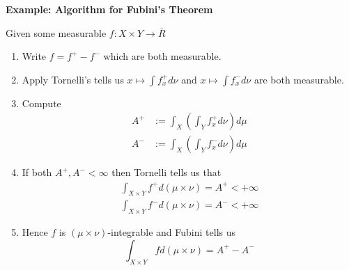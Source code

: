\documentclass[11pt]{article}
\newcommand{\defeq}{:=}
\newenvironment{eg}
{\begin{mdframed}[backgroundcolor=mylg,roundcorner=5pt,linewidth=0pt]\bfseries{Example:}\normalfont}
	{\end{mdframed}}
\begin{document}
\begin{eg}
	\textbf{Algorithm for Fubini's Theorem}

	Given some measurable $f:X\times Y \to \overline{R}$
	\begin{enumerate}
		\item Write $f=f^+ - f^-$ which are both measurable.
		\item Apply Tornelli's tells us $x\mapsto \int f^+_x d\nu $ and $x\mapsto\int f^-_x d\nu$ are both measurable.
		\item Compute 
			\begin{align*}
				A^+&\defeq \int_X\left(\int_Y f^+_x d \nu\right) d\mu\\
				A^-&\defeq \int_X\left(\int_Y f^-_x d \nu\right) d\mu
			\end{align*}
		\item If both $A^+, A^- < \infty$ then Tornelli tells us that
			\begin{align*}
				\int_{X\times Y} f^+ d(\mu\times \nu)= A^+ < +\infty\\
				\int_{X\times Y} f^- d(\mu\times \nu)= A^- < +\infty	
			\end{align*}
		\item Hence $f$ is $(\mu\times\nu)$-integrable and Fubini tells us
			\[
				\int_{X\times Y} f d(\mu\times\nu)= A^+ - A^-
			\]
	\end{enumerate}
\end{eg}
\end{document}
